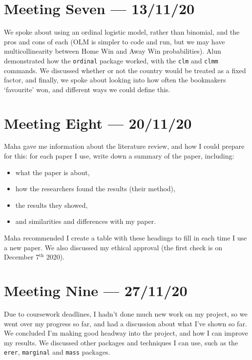 \documentclass[a4paper,10pt]{report}
\begin{document}
\section*{Meeting Seven --- 13/11/20}
We spoke about using an ordinal logistic model, rather than binomial, and the pros and cons of each (OLM is simpler to code and run, but we may have multicollinearity between Home Win and Away Win probabilities). Alun demonstrated how the \texttt{ordinal} package worked, with the \lstinline|clm| and \lstinline|clmm| commands. We discussed whether or not the country would be treated as a fixed factor, and finally, we spoke about looking into how often the bookmakers `favourite' won, and different ways we could define this.

\section*{Meeting Eight --- 20/11/20}
Maha gave me information about the literature review, and how I could prepare for this: for each paper I use, write down a summary of the paper, including:
\begin{itemize}
	\item what the paper is about,
	\item how the researchers found the results (their method),
	\item the results they showed,
	\item and similarities and differences with my paper.
\end{itemize}
Maha recommended I create a table with these headings to fill in each time I use a new paper. We also discussed my ethical approval (the first check is on December 7$^{\textrm{th}}$ 2020). 

\section*{Meeting Nine --- 27/11/20}
Due to coursework deadlines, I hadn't done much new work on my project, so we went over my progress so far, and had a discussion about what I've shown so far. We concluded I'm making good headway into the project, and how I can improve my results. We discussed other packages and techniques I can use, such as the \lstinline|erer|, \lstinline|marginal| and \lstinline|mass| packages.
\end{document}
